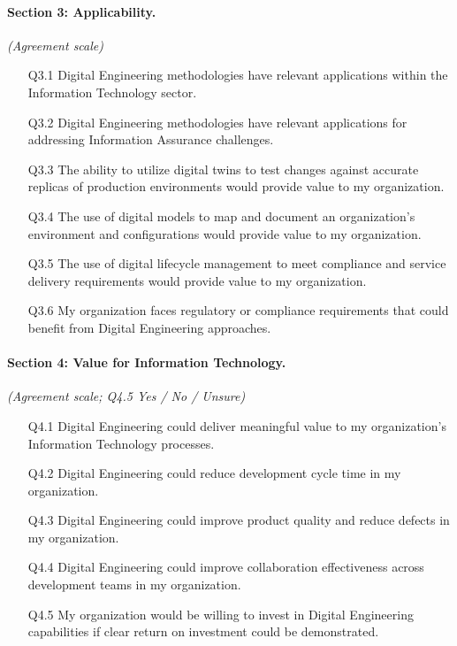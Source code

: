   \paragraph{Section 3: Applicability.} \emph{(Agreement scale)}
  \begin{enumerate}[leftmargin=2.4em,itemsep=1pt]
    \item[Q3.1] Digital Engineering methodologies have relevant applications within the Information Technology sector.
    \item[Q3.2] Digital Engineering methodologies have relevant applications for addressing Information Assurance challenges.
    \item[Q3.3] The ability to utilize digital twins to test changes against accurate replicas of production environments would provide value to my organization.
    \item[Q3.4] The use of digital models to map and document an organization's environment and configurations would provide value to my organization.
    \item[Q3.5] The use of digital lifecycle management to meet compliance and service delivery requirements would provide value to my organization.
    \item[Q3.6] My organization faces regulatory or compliance requirements that could benefit from Digital Engineering approaches.
  \end{enumerate}

  \paragraph{Section 4: Value for Information Technology.} \emph{(Agreement scale; Q4.5 Yes / No / Unsure)}
  \begin{enumerate}[leftmargin=2.4em,itemsep=1pt]
    \item[Q4.1] Digital Engineering could deliver meaningful value to my organization's Information Technology processes.
    \item[Q4.2] Digital Engineering could reduce development cycle time in my organization.
    \item[Q4.3] Digital Engineering could improve product quality and reduce defects in my organization.
    \item[Q4.4] Digital Engineering could improve collaboration effectiveness across development teams in my organization.
    \item[Q4.5] My organization would be willing to invest in Digital Engineering capabilities if clear return on investment could be demonstrated.
  \end{enumerate}

